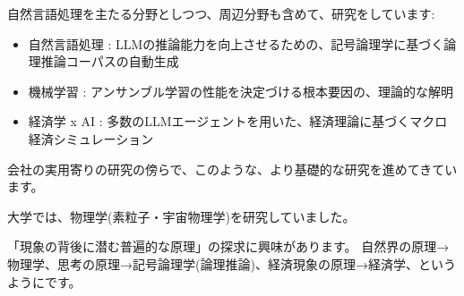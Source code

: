 \indent 自然言語処理を主たる分野としつつ、周辺分野も含めて、研究をしています:
\vspace{1mm}
\begin{itemize}
  \item 自然言語処理 : LLMの推論能力を向上させるための、記号論理学に基づく論理推論コーパスの自動生成
  \item 機械学習 : アンサンブル学習の性能を決定づける根本要因の、理論的な解明
  \item 経済学 x AI : 多数のLLMエージェントを用いた、経済理論に基づくマクロ経済シミュレーション
\end{itemize}
\vspace{0.5mm}
\indent 会社の実用寄りの研究の傍らで、このような、より基礎的な研究を進めてきています。

\vspace{3mm}
\indent 大学では、物理学(素粒子・宇宙物理学)を研究していました。

\vspace{3mm}
\indent 「現象の背後に潜む普遍的な原理」の探求に興味があります。
自然界の原理→物理学、思考の原理→記号論理学(論理推論)、経済現象の原理→経済学、というようにです。
